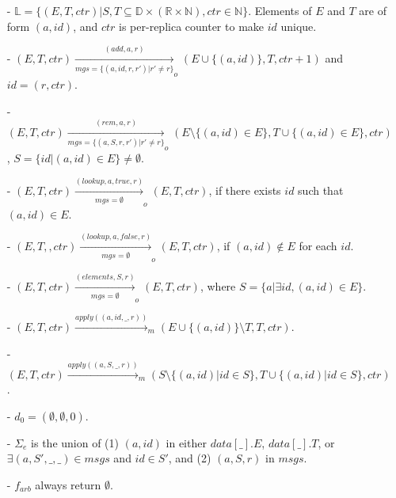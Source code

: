 \begin{itemize}
\setlength{\itemsep}{0.5pt}
\item[-] $\mathbb{L} = \{ (E,T,\mathit{ctr}) \vert S,T \subseteq \mathbb{D} \times (\mathbb{R} \times \mathbb{N}), \mathit{ctr} \in \mathbb{N} \}$. Elements of $E$ and $T$ are of form $(a,id)$, and $\mathit{ctr}$ is per-replica counter to make $id$ unique.

\item[-] $(E,T,\mathit{ctr}) \xrightarrow[\mathit{mgs} = \{ (a,\mathit{id},r,r') \vert r' \neq r \}]{(\mathit{add},a,r)}_o (E \cup \{ (a,\mathit{id}) \}, T, \mathit{ctr}+1)$ and $\mathit{id} = (r,\mathit{ctr})$.

\item[-] $(E,T,\mathit{ctr}) \xrightarrow[\mathit{mgs} = \{ (a,S,r,r') \vert r' \neq r \} ]{(\mathit{rem},a,r)}_o (E \setminus \{ (a,\mathit{id}) \in E \}, T \cup \{ (a,\mathit{id}) \in E \}, \mathit{ctr})$, $S = \{ \mathit{id} \vert (a,\mathit{id}) \in E \} \neq \emptyset$.

\item[-] $(E,T,\mathit{ctr}) \xrightarrow[\mathit{mgs} = \emptyset]{(\mathit{lookup},a,\mathit{true},r)}_o (E,T,\mathit{ctr})$, if there exists $\mathit{id}$ such that $(a,\mathit{id}) \in E$.

\item[-] $(E,T,,\mathit{ctr}) \xrightarrow[\mathit{mgs} = \emptyset]{(\mathit{lookup},a,\mathit{false},r)}_o (E,T, \mathit{ctr})$, if $(a,\mathit{id}) \notin E$ for each $\mathit{id}$.

\item[-] $(E,T,\mathit{ctr}) \xrightarrow[\mathit{mgs} = \emptyset]{(\mathit{elements},S,r)}_o (E,T,\mathit{ctr})$, where $S = \{ a \vert \exists \mathit{id}, (a,\mathit{id}) \in E \}$.

\item[-] $(E,T,\mathit{ctr}) \xrightarrow{\mathit{apply}((a,\mathit{id},\_,r))}_m (E \cup \{ (a,\mathit{id}) \} \setminus T, T,\mathit{ctr})$.

\item[-] $(E,T,\mathit{ctr}) \xrightarrow{\mathit{apply}((a,S,\_,r))}_m (S \setminus \{ (a,\mathit{id}) \vert \mathit{id} \in S \}, T \cup \{ (a,\mathit{id}) \vert \mathit{id} \in S \}, \mathit{ctr})$.

\item[-] $d_0 = (\emptyset, \emptyset, 0)$.

\item[-] $\Sigma_e$ is the union of (1) $(a,\mathit{id})$ in either $\mathit{data}[\_].E$, $\mathit{data}[\_].T$, or $\exists (a,S',\_,\_) \in \mathit{msgs}$ and $\mathit{id} \in S'$, and (2) $(a,S,r)$ in $\mathit{msgs}$.

\item[-] $f_{\mathit{arb}}$ always return $\emptyset$.
\end{itemize}


